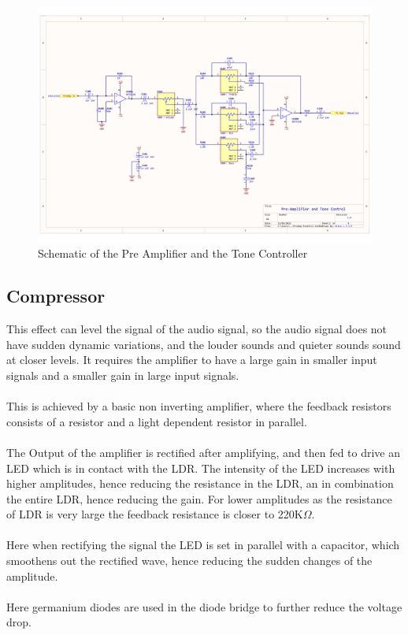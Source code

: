 \documentclass{article}
\begin{document}
                \begin{figure}
                    \centering
                    \includegraphics[scale=0.4]{preamp-sch.png}
                    \caption{Schematic of the Pre Amplifier and the Tone Controller}
                    \label{fig:enter-label}
                \end{figure}

            \subsection{Compressor}
                This effect can level the signal of the audio signal, so the audio signal does not have sudden dynamic variations, and the louder sounds and quieter sounds sound at closer levels. It requires the amplifier to have a large gain in smaller input signals and a smaller gain in large input signals.\\\\
                This is achieved by a basic non inverting amplifier, where the feedback resistors consists of a resistor and a light dependent resistor in parallel.\\\\
                The Output of the amplifier is rectified after amplifying, and then fed to drive an LED which is in contact with the LDR. The intensity of the LED increases with higher amplitudes, hence reducing the resistance in the LDR, an in combination the entire LDR, hence reducing the gain. For lower amplitudes as the resistance of LDR is very large the feedback resistance is closer to 220K$\Omega$.\\\\
                Here when rectifying the signal the LED is set in parallel with a capacitor, which smoothens out the rectified wave, hence reducing the sudden changes of the amplitude.\\\\
                Here germanium diodes are used in the diode bridge to further reduce the voltage drop.
\end{document}
